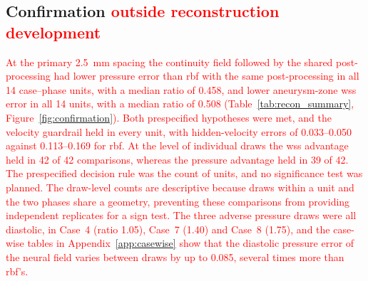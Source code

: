 \documentclass[12pt,a4paper]{article}
\newcommand{\WSS}{\ac{wss}\xspace}
\newcommand{\RBF}{\ac{rbf}\xspace}
\theoremstyle{definition}
\numberwithin{equation}{section}
\newcommand{\revision}[1]{\textcolor{red}{#1}}
\begin{document}



\subsection{Confirmation   \revision{outside reconstruction development} }
\label{sec:confirmation}
\revision{At the primary 2.5~mm spacing the continuity field followed by the shared post-processing had lower pressure error than \RBF with the same post-processing in all 14 case--phase units, with a median ratio of 0.458, and lower aneurysm-zone \WSS error in all 14 units, with a median ratio of 0.508 (Table~\ref{tab:recon_summary}, Figure~\ref{fig:confirmation}). Both prespecified hypotheses were met, and the velocity guardrail held in every unit, with hidden-velocity errors of 0.033--0.050 against 0.113--0.169 for \RBF. At the level of individual draws the \WSS advantage held in 42 of 42 comparisons, whereas the pressure advantage held in 39 of 42. The prespecified decision rule was the count of units, and no significance test was planned. The draw-level counts are descriptive because draws within a unit and the two phases share a geometry, preventing these comparisons from providing independent replicates for a sign test. The three adverse pressure draws were all diastolic, in Case~4 (ratio 1.05), Case~7 (1.40) and Case~8 (1.75), and the case-wise tables in Appendix~\ref{app:casewise} show that the diastolic pressure error of the neural field varies between draws by up to 0.085, several times more than \RBF's.}


\end{document}
